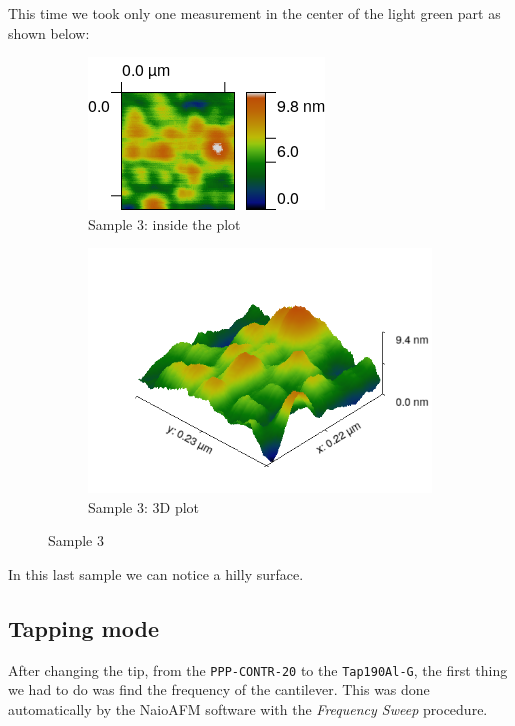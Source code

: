 \documentclass[11pt,a4paper]{article}
\begin{document}
This time we took only one measurement in the center of the light green part as shown below:

\begin{figure}[H]
\centering
\begin{subfigure}[b]{0.45\textwidth}
\includegraphics[width=\textwidth]{sm_sample3}
\caption{Sample 3: inside the plot}
\label{fig:}
\end{subfigure}
\begin{subfigure}[b]{0.45\textwidth}
\includegraphics[width=\textwidth]{sm_sample3_3D_improved}
\caption{Sample 3: 3D plot}
\label{fig:}
\end{subfigure}
\caption{Sample 3}
\end{figure}

In this last sample we can notice a hilly surface.

\subsection{Tapping mode}
After changing the tip, from the \texttt{PPP-CONTR-20} to the \texttt{Tap190Al-G}, the first thing we had to do was find the frequency of the cantilever. This was done automatically by the NaioAFM software with the \emph{Frequency Sweep} procedure.
\end{document}
